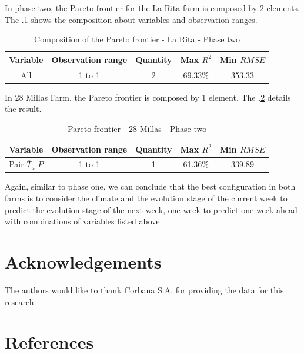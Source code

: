 \documentclass[review,authoryear,english]{elsarticle}
\begin{document}
In phase two, the Pareto frontier for the La Rita farm is composed by 2 elements. The \tablename $.$\ref{tabla4} shows the composition about variables and observation ranges.

\begin{table}[h] 
\caption{Composition of the Pareto frontier - La Rita - Phase two} 
\label{tabla4} 
\centering
\begin{tabular}{c|c|c|c|c} 
\hline
\bfseries Variable & \bfseries Observation range & \bfseries Quantity & \bfseries Max $R^2$ & \bfseries Min $RMSE$\\ 
\hline\hline 
All & 1 to 1  & 2 & 69.33\% & 353.33 \\
\hline
\end{tabular} 
\end{table}

In 28 Millas Farm, the Pareto frontier is composed by 1 element. The \tablename $.$\ref{tabla5} details the result.

\begin{table}[h] 
\caption{Pareto frontier - 28 Millas - Phase two} 
\label{tabla5} 
\centering
\begin{tabular}{c|c|c|c|c} 
\hline
\bfseries Variable & \bfseries Observation range & \bfseries Quantity & \bfseries Max $R^2$ & \bfseries Min $RMSE$\\ 
\hline\hline 
Pair $\overline{T}_{a}$ $P$ & 1 to 1 & 1 & 61.36\% & 339.89 \\
\hline
\end{tabular} 
\end{table}

Again, similar to phase one, we can conclude that the best configuration in both farms is to consider the climate and the evolution stage of the current week to predict the evolution stage of the next week, one week to predict one week ahead with combinations of variables listed above.

\section{Acknowledgements}

The authors would like to thank Corbana S.A. for providing the data for this research. 

\section{References}


\end{document}
